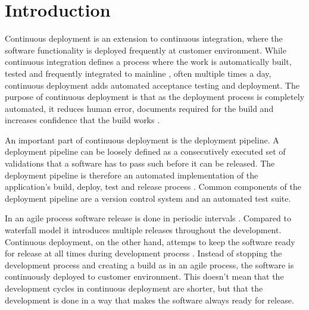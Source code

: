 \documentclass[conference]{IEEEtran}
\begin{document}
\IEEEpeerreviewmaketitle




%



\section{Introduction} %
Continuous deployment is an extension to continuous integration, where the software functionality is deployed frequently at customer environment. While continuous integration defines a process where the work is automatically built, tested and frequently integrated to mainline \cite{fowler2006continuous}, often multiple times a day, continuous deployment adds automated acceptance testing and deployment. The purpose of continuous deployment is that as the deployment process is completely automated, it reduces human error, documents required for the build and increases confidence that the build works \cite{cdbook}. %

An important part of continuous deployment is the deployment pipeline. A deployment pipeline can be loosely defined as a consecutively executed set of validations that a software has to pass such before it can be released. The deployment pipeline is therefore an automated implementation of the application's build, deploy, test and release process \cite{cdbook}. Common components of the deployment pipeline are a version control system and an automated test suite.

In an agile process software release is done in periodic intervals \cite{cockburn2002agile}. Compared to waterfall model it introduces multiple releases throughout the development. Continuous deployment, on the other hand, attemps to keep the software ready for release at all times during development process \cite{cdbook}. Instead of stopping the development process and creating a build as in an agile process, the software is continuously deployed to customer environment. This doesn't mean that the development cycles in continuous deployment are shorter, but that the development is done in a way that makes the software always ready for release.
\end{document}
